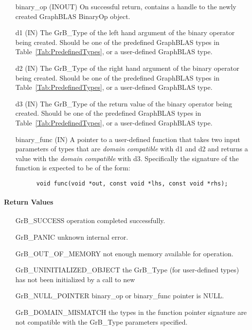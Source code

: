 \begin{itemize}[leftmargin=1.1in]
    \item[{\sf binary\_op}] ({\sf INOUT}) On successful return, contains a 
          handle to the newly created GraphBLAS BinaryOp object.
    \item[{\sf d1}]  ({\sf IN}) The {\sf GrB\_Type} of the left hand 
          argument of the binary operator being created. Should be one of the
          predefined GraphBLAS types in Table~\ref{Tab:PredefinedTypes}, or a
          user-defined GraphBLAS type.
    \item[{\sf d2}]  ({\sf IN}) The {\sf GrB\_Type} of the right hand 
          argument of the binary operator being created. Should be one of the
          predefined GraphBLAS types in Table~\ref{Tab:PredefinedTypes}, or a 
          user-defined GraphBLAS type.
    \item[{\sf d3}]  ({\sf IN}) The {\sf GrB\_Type} of the return
          value of the binary operator being created. Should be one of the
          predefined GraphBLAS types in Table~\ref{Tab:PredefinedTypes}, or a 
          user-defined GraphBLAS type.
    \item[{\sf binary\_func}] ({\sf IN}) A pointer to a user-defined function that 
          takes two input parameters of types that are \emph{domain compatible} with {\sf d1} and {\sf d2} and returns a value with the \emph{domain compatible} with {\sf d3}.
          Specifically the signature of the function is expected to 
          be of the form:
      \begin{verbatim}
      void func(void *out, const void *lhs, const void *rhs);
      \end{verbatim}
\end{itemize}

\paragraph{Return Values}

\begin{itemize}[leftmargin=2.1in]
\item[{\sf GrB\_SUCCESS}]           operation completed successfully.
\item[{\sf GrB\_PANIC}]             unknown internal error.
\item[{\sf GrB\_OUT\_OF\_MEMORY}]          not enough memory available for operation.
\item[{\sf GrB\_UNINITIALIZED\_OBJECT}]          the {\sf GrB\_Type} (for user-defined types)
                                    has not been initialized by a call to {\sf new}
\item[{\sf GrB\_NULL\_POINTER}]    {\sf binary\_op} or {\sf binary\_func} pointer is {\sf NULL}.
\item[{\sf GrB\_DOMAIN\_MISMATCH}]  the types in the function pointer signature are not   
                                    compatible with the {\sf GrB\_Type} parameters specified.
\end{itemize}


